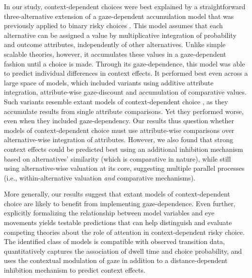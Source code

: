 \documentclass[11pt, a4paper]{article}
\begin{document}
In our study, context-dependent choices were best explained by a straightforward three-alternative extension of a gaze-dependent accumulation model that was previously applied to binary risky choices \parencite{glickman2019FormationPreferenceRisky}. This model assumes that each alternative can be assigned a value by multiplicative integration of probability and outcome attributes, independently of other alternatives. Unlike simple scalable theories, however, it accumulates these values in a gaze-dependent fashion until a choice is made. Through its gaze-dependence, this model was able to predict individual differences in context effects. It performed best even across a large space of models, which included variants using additive attribute integration, attribute-wise gaze-discount and accumulation of comparative values. Such variants resemble extant models of context-dependent choice \parencite[e.g., MDFT;]{roe2001MultialternativeDecisionField}, as they accumulate results from single attribute comparisons. Yet they performed worse, even when they included gaze-dependency. Our results thus question whether models of context-dependent choice must use attribute-wise comparisons over alternative-wise integration of attributes. However, we also found that strong context effects could be predicted best using an additional inhibition mechanism based on alternatives’ similarity (which is comparative in nature), while still using alternative-wise valuation at its core, suggesting multiple parallel processes (i.e., within-alternative valuation \emph{and} comparative mechanisms). 

More generally, our results suggest that extant models of context-dependent choice are likely to benefit from implementing gaze-dependence. Even further, explicitly formalizing the relationship between model variables and eye movements yields testable predictions that can help distinguish and evaluate competing theories about the role of attention in context-dependent risky choice. The identified class of models is compatible with observed transition data, quantitatively captures the association of dwell time and choice probability, and uses the contextual modulation of gaze in addition to a distance-dependent inhibition mechanism to predict context effects.

\clearpage
\end{document}
